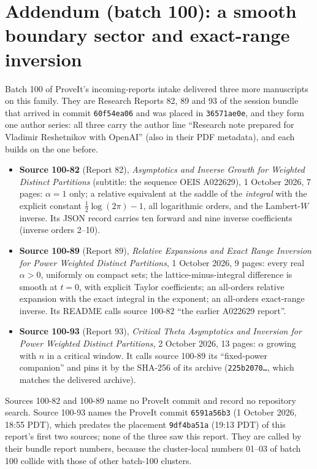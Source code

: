 \documentclass[11pt]{article}
\numberwithin{equation}{section}
\theoremstyle{definition}\newtheorem{definition}[theorem]{Definition}
\theoremstyle{remark}\newtheorem{remark}[theorem]{Remark}
\begin{document}
\section{Addendum (batch 100): a smooth boundary sector and exact-range inversion}\label{dpn:rb:sec:b100}
Batch 100 of ProveIt's incoming-reports intake delivered three more
manuscripts on this family.  They are Research Reports 82, 89 and 93 of the
session bundle that arrived in commit \texttt{60f54ea06} and was placed in
\texttt{36571ae0e}, and they form one author series: all three carry the
author line ``Research note prepared for Vladimir Reshetnikov with OpenAI''
(also in their PDF metadata), and each builds on the one before.
\begin{itemize}
\item \textbf{Source 100-82} (Report 82), \emph{Asymptotics and Inverse
  Growth for Weighted Distinct Partitions} (subtitle: the sequence OEIS
  A022629), 1 October 2026, 7 pages: $\alpha=1$ only; a relative equivalent
  at the saddle of the \emph{integral} with the explicit constant
  $\tfrac12\log(2\pi)-1$, all logarithmic orders, and the Lambert-$W$
  inverse.  Its JSON record carries ten forward and nine inverse
  coefficients (inverse orders 2--10).
\item \textbf{Source 100-89} (Report 89), \emph{Relative Expansions and Exact
  Range Inversion for Power Weighted Distinct Partitions}, 1 October 2026,
  9 pages: every real $\alpha>0$, uniformly on compact sets; the
  lattice-minus-integral difference is smooth at $t=0$, with explicit
  Taylor coefficients; an all-orders relative expansion with the exact
  integral in the exponent; an all-orders exact-range inverse.  Its README
  calls source 100-82 ``the earlier A022629 report''.
\item \textbf{Source 100-93} (Report 93), \emph{Critical Theta Asymptotics and
  Inversion for Power Weighted Distinct Partitions}, 2 October 2026,
  13 pages: $\alpha$ growing with $n$ in a critical window.  It calls source
  100-89 its ``fixed-power companion'' and pins it by the SHA-256 of its
  archive (\texttt{225b2070\ldots}, which matches the delivered archive).
\end{itemize}
Sources 100-82 and 100-89 name no ProveIt commit and record no repository
search.  Source 100-93 names the ProveIt commit \texttt{6591a56b3} (1 October
2026, 18:55 PDT), which predates the placement \texttt{9df4ba51a} (19:13 PDT)
of this report's first two sources; none of the three saw this report.  They
are called by their bundle report numbers, because the cluster-local numbers
01--03 of batch 100 collide with those of other batch-100 clusters.
\end{document}

